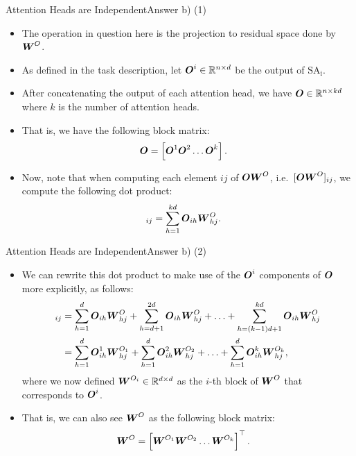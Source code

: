 \documentclass[t]{beamer}
\newcommand\op[1]{\operatorname{#1}}
\begin{document}
\begin{frame}{Attention Heads are Independent}{Answer b) (1)}
    \begin{itemize}
        \item The operation in question here is the projection to residual space
              done by ${\boldsymbol{W}}^O$.
        \item As defined in the task description, let
              ${\boldsymbol{O}}^i\in\mathbb{R}^{n\times d}$ be the output of $\op{SA_i}$.
        \item After concatenating the output of
              each attention head, we have ${\boldsymbol{O}}\in\mathbb{R}^{n\times kd}$ where $k$
              is the number of attention heads.
        \item That is, we have the following
              block matrix:
              \begin{align}
                  {\boldsymbol{O}} & = \left[{\boldsymbol{O}}^1 {\boldsymbol{O}}^2 \ldots {\boldsymbol{O}}^k\right].
              \end{align}
        \item Now, note that when computing each element $ij$ of ${\boldsymbol{O}}{\boldsymbol{W}}^O$,
              i.e.\ $[{\boldsymbol{O}}{\boldsymbol{W}}^O]_{ij}$, we compute the following dot product:
              \begin{align}
                  [\mO\mW^O]_{ij} & = \sum_{h=1}^{kd} \mO_{ih}\mW^O_{hj}.
              \end{align}
    \end{itemize}
\end{frame}

\begin{frame}{Attention Heads are Independent}{Answer b) (2)}
    \begin{itemize}
        \item We can rewrite this dot product to make use of the ${\boldsymbol{O}}^i$
              components of ${\boldsymbol{O}}$ more explicitly, as follows:
              {\small
              \begin{align}
                  [\mO\mW^O]_{ij} & = \sum_{h=1}^{d} \mO_{ih}\mW^O_{hj} + \sum_{h=d+1}^{2d} \mO_{ih}\mW^O_{hj} + \ldots + \sum_{h=(k-1)d+1}^{kd} \mO_{ih}\mW^O_{hj}         \\
                                  & = \sum_{h=1}^{d} \mO^1_{ih}\mW^{O_1}_{hj} + \sum_{h=1}^{d} \mO^2_{ih}\mW^{O_2}_{hj} + \ldots + \sum_{h=1}^{d} \mO^k_{ih}\mW^{O_k}_{hj},
              \end{align}
              }
              where we now defined ${\boldsymbol{W}}^{O_i}\in\mathbb{R}^{d\times d}$ as the
              $i$-th block of ${\boldsymbol{W}}^O$ that corresponds to ${\boldsymbol{O}}^i$.
        \item That is, we can also see ${\boldsymbol{W}}^O$ as the following block matrix:
              \begin{align}
                  {\boldsymbol{W}}^O & = \left[{\boldsymbol{W}}^{O_1} {\boldsymbol{W}}^{O_2} \ldots {\boldsymbol{W}}^{O_k}\right]^\top.
              \end{align}
    \end{itemize}
\end{frame}
\end{document}
